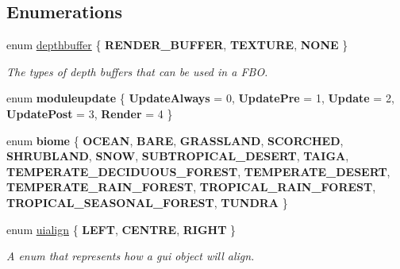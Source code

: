 \subsection*{Enumerations}
\begin{DoxyCompactItemize}
\item 
enum \hyperlink{namespaceflounder_aed09c736167e783c910ec9e58479b57c}{depthbuffer} \{ {\bfseries R\+E\+N\+D\+E\+R\+\_\+\+B\+U\+F\+F\+ER}, 
{\bfseries T\+E\+X\+T\+U\+RE}, 
{\bfseries N\+O\+NE}
 \}\begin{DoxyCompactList}\small\item\em The types of depth buffers that can be used in a F\+BO. \end{DoxyCompactList}
\item 
\mbox{\label{namespaceflounder_aa7d78de523d27c4a1995455e0152b067}} 
enum {\bfseries moduleupdate} \{ \newline
{\bfseries Update\+Always} = 0, 
{\bfseries Update\+Pre} = 1, 
{\bfseries Update} = 2, 
{\bfseries Update\+Post} = 3, 
\newline
{\bfseries Render} = 4
 \}
\item 
\mbox{\label{namespaceflounder_af42b21ba4c049bb2746becc028e03cc9}} 
enum {\bfseries biome} \{ \newline
{\bfseries O\+C\+E\+AN}, 
{\bfseries B\+A\+RE}, 
{\bfseries G\+R\+A\+S\+S\+L\+A\+ND}, 
{\bfseries S\+C\+O\+R\+C\+H\+ED}, 
\newline
{\bfseries S\+H\+R\+U\+B\+L\+A\+ND}, 
{\bfseries S\+N\+OW}, 
{\bfseries S\+U\+B\+T\+R\+O\+P\+I\+C\+A\+L\+\_\+\+D\+E\+S\+E\+RT}, 
{\bfseries T\+A\+I\+GA}, 
\newline
{\bfseries T\+E\+M\+P\+E\+R\+A\+T\+E\+\_\+\+D\+E\+C\+I\+D\+U\+O\+U\+S\+\_\+\+F\+O\+R\+E\+ST}, 
{\bfseries T\+E\+M\+P\+E\+R\+A\+T\+E\+\_\+\+D\+E\+S\+E\+RT}, 
{\bfseries T\+E\+M\+P\+E\+R\+A\+T\+E\+\_\+\+R\+A\+I\+N\+\_\+\+F\+O\+R\+E\+ST}, 
{\bfseries T\+R\+O\+P\+I\+C\+A\+L\+\_\+\+R\+A\+I\+N\+\_\+\+F\+O\+R\+E\+ST}, 
\newline
{\bfseries T\+R\+O\+P\+I\+C\+A\+L\+\_\+\+S\+E\+A\+S\+O\+N\+A\+L\+\_\+\+F\+O\+R\+E\+ST}, 
{\bfseries T\+U\+N\+D\+RA}
 \}
\item 
enum \hyperlink{namespaceflounder_a70f1871d5c05aa8e078dd37501ce10a9}{uialign} \{ {\bfseries L\+E\+FT}, 
{\bfseries C\+E\+N\+T\+RE}, 
{\bfseries R\+I\+G\+HT}
 \}\begin{DoxyCompactList}\small\item\em A enum that represents how a gui object will align. \end{DoxyCompactList}
\end{DoxyCompactItemize}
